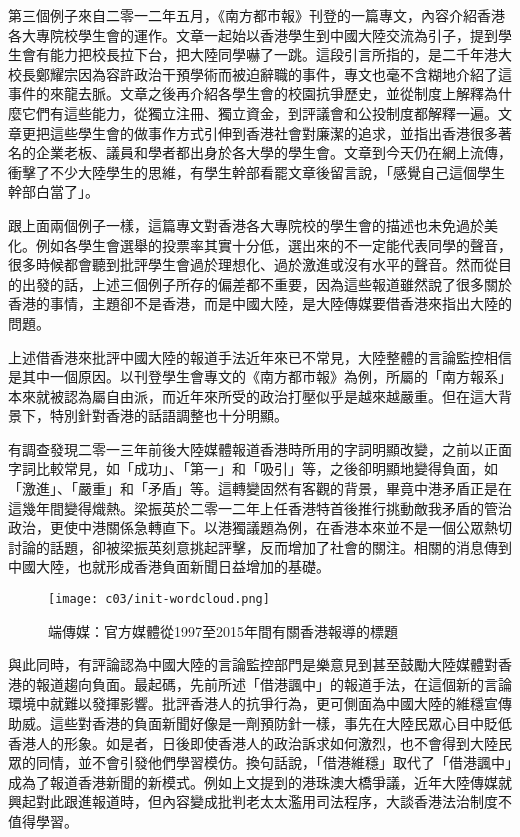 第三個例子來自二零一二年五月，《南方都市報》刊登的一篇專文，內容介紹香港各大專院校學生會的運作。文章一起始以香港學生到中國大陸交流為引子，提到學生會有能力把校長拉下台，把大陸同學嚇了一跳。這段引言所指的，是二千年港大校長鄭耀宗因為容許政治干預學術而被迫辭職的事件，專文也毫不含糊地介紹了這事件的來龍去脈。文章之後再介紹各學生會的校園抗爭歷史，並從制度上解釋為什麼它們有這些能力，從獨立注冊、獨立資金，到評議會和公投制度都解釋一遍。文章更把這些學生會的做事作方式引伸到香港社會對廉潔的追求，並指出香港很多著名的企業老板、議員和學者都出身於各大學的學生會。文章到今天仍在網上流傳，衝擊了不少大陸學生的思維，有學生幹部看罷文章後留言說，「感覺自己這個學生幹部白當了」。

跟上面兩個例子一樣，這篇專文對香港各大專院校的學生會的描述也未免過於美化。例如各學生會選舉的投票率其實十分低，選出來的不一定能代表同學的聲音，很多時候都會聽到批評學生會過於理想化、過於激進或沒有水平的聲音。然而從目的出發的話，上述三個例子所存的偏差都不重要，因為這些報道雖然說了很多關於香港的事情，主題卻不是香港，而是中國大陸，是大陸傳媒要借香港來指出大陸的問題。

上述借香港來批評中國大陸的報道手法近年來已不常見，大陸整體的言論監控相信是其中一個原因。以刊登學生會專文的《南方都市報》為例，所屬的「南方報系」本來就被認為屬自由派，而近年來所受的政治打壓似乎是越來越嚴重。但在這大背景下，特別針對香港的話語調整也十分明顯。

有調查發現二零一三年前後大陸媒體報道香港時所用的字詞明顯改變，之前以正面字詞比較常見，如「成功」、「第一」和「吸引」等，之後卻明顯地變得負面，如「激進」、「嚴重」和「矛盾」等。這轉變固然有客觀的背景，畢竟中港矛盾正是在這幾年間變得熾熱。梁振英於二零一二年上任香港特首後推行挑動敵我矛盾的管治政治，更使中港關係急轉直下。以港獨議題為例，在香港本來並不是一個公眾熱切討論的話題，卻被梁振英刻意挑起評擊，反而增加了社會的關注。相關的消息傳到中國大陸，也就形成香港負面新聞日益增加的基礎。

\begin{figure}[htbp]
    \centering
    \texttt{[image: c03/init-wordcloud.png]}
    \caption{端傳媒：官方媒體從1997至2015年間有關香港報導的標題} 
\end{figure}

與此同時，有評論認為中國大陸的言論監控部門是樂意見到甚至鼓勵大陸媒體對香港的報道趨向負面。最起碼，先前所述「借港諷中」的報道手法，在這個新的言論環境中就難以發揮影響。批評香港人的抗爭行為，更可側面為中國大陸的維穩宣傳助威。這些對香港的負面新聞好像是一劑預防針一樣，事先在大陸民眾心目中貶低香港人的形象。如是者，日後即使香港人的政治訴求如何激烈，也不會得到大陸民眾的同情，並不會引發他們學習模仿。換句話說，「借港維穩」取代了「借港諷中」成為了報道香港新聞的新模式。例如上文提到的港珠澳大橋爭議，近年大陸傳媒就興起對此跟進報道時，但內容變成批判老太太濫用司法程序，大談香港法治制度不值得學習。

